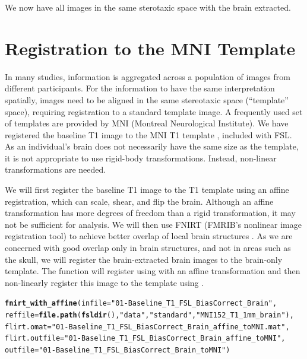 \documentclass[a4paper]{report}\usepackage[]{graphicx}\usepackage[]{color}
\makeatletter
\newcommand{\hlstr}[1]{\textcolor[rgb]{0.192,0.494,0.8}{#1}}%
\newcommand{\hlstd}[1]{\textcolor[rgb]{0.345,0.345,0.345}{#1}}%
\newcommand{\hlkwc}[1]{\textcolor[rgb]{0.333,0.667,0.333}{#1}}%
\newcommand{\hlkwd}[1]{\textcolor[rgb]{0.737,0.353,0.396}{\textbf{#1}}}%
\newenvironment{kframe}{%
 \def\at@end@of@kframe{}%
 \ifinner\ifhmode%
  \def\at@end@of@kframe{\end{minipage}}%
  \begin{minipage}{\columnwidth}%
 \fi\fi%
 \def\FrameCommand##1{\hskip\@totalleftmargin \hskip-\fboxsep
 \colorbox{shadecolor}{##1}\hskip-\fboxsep
     \hskip-\linewidth \hskip-\@totalleftmargin \hskip\columnwidth}%
 \MakeFramed {\advance\hsize-\width
   \@totalleftmargin\z@ \linewidth\hsize
   \@setminipage}}%
 {\par\unskip\endMakeFramed%
 \at@end@of@kframe}
\newenvironment{knitrout}{}{} %
\newcommand\gobblepars{%
    \@ifnextchar\par%
        {\expandafter\gobblepars\@gobble}%
        {}}
\let\pkg=\strong
\DeclareRobustCommand\code{\bgroup\@noligs\@codex}
\makeatother
\begin{document}
\begin{article}
We now have all images in the same sterotaxic space with the brain extracted.  

\section{Registration to the MNI Template}
In many studies, information is aggregated across a population of images from different participants.  For the information to have the same interpretation spatially, images need to be aligned in the same stereotaxic space (``template'' space), requiring registration to a standard template image.  A frequently used set of templates are provided by MNI (Montreal Neurological Institute). We have registered the baseline T1 image to the MNI T1 template \citep{hutchison_symmetric_2006}, included with FSL.  As an individual's brain does not necessarily have the same size as the template, it is not appropriate to use rigid-body transformations.  Instead, non-linear transformations are needed.


We will first register the baseline T1 image to the T1 template using an affine registration, which can scale, shear, and flip the brain.  Although an affine transformation has more degrees of freedom than a rigid transformation, it may not be sufficient for analysis.  We will then use FNIRT (FMRIB's nonlinear image registration tool) to achieve better overlap of local brain structures \citep{jenkinson_fsl_2012, andersson_non-linear_2007}.  As we are concerned with good overlap only in brain structures, and not in areas such as the skull, we will register the brain-extracted brain images to the brain-only template.  The \pkg{fslr} function \code{fnirt\_with\_affine} will register using \code{flirt} with an affine transformation and then non-linearly register this image to the template using \code{fnirt}.


\gobblepars
\begin{knitrout}
\color{fgcolor}\begin{kframe}
\begin{alltt}
\hlkwd{fnirt_with_affine}\hlstd{(}\hlkwc{infile} \hlstd{=} \hlstr{"01-Baseline_T1_FSL_BiasCorrect_Brain"}\hlstd{,}
                  \hlkwc{reffile} \hlstd{=} \hlkwd{file.path}\hlstd{(}\hlkwd{fsldir}\hlstd{(),} \hlstr{"data"}\hlstd{,} \hlstr{"standard"}\hlstd{,} \hlstr{"MNI152_T1_1mm_brain"}\hlstd{),}
                  \hlkwc{flirt.omat} \hlstd{=} \hlstr{"01-Baseline_T1_FSL_BiasCorrect_Brain_affine_toMNI.mat"}\hlstd{,}
                  \hlkwc{flirt.outfile} \hlstd{=} \hlstr{"01-Baseline_T1_FSL_BiasCorrect_Brain_affine_toMNI"}\hlstd{,}
                  \hlkwc{outfile} \hlstd{=} \hlstr{"01-Baseline_T1_FSL_BiasCorrect_Brain_toMNI"}\hlstd{)}
\end{alltt}
\end{kframe}
\end{knitrout}
\gobblepars


\end{article}
\end{document}
